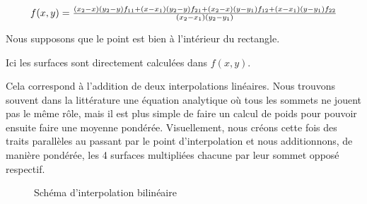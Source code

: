 \begin{equation}
    \resizebox{0.9\hsize}{!}{$
    f(x, y) = \frac{(x_2 - x)(y_2 - y)f_{11} + (x - x_1)(y_2 - y)f_{21} + (x_2 - x)(y - y_1)f_{12} + (x - x_1)(y - y_1)f_{22}}{(x_2 - x_1)(y_2 - y_1)}
    $}
\end{equation}
                
Nous supposons que le point est bien à l'intérieur du rectangle.

Ici les surfaces sont directement calculées dans \(f(x, y)\).

Cela correspond à l'addition de deux interpolations linéaires. Nous trouvons souvent dans la littérature une équation analytique où tous les sommets ne jouent pas le même rôle, mais il est plus simple de faire un calcul de poids pour pouvoir ensuite faire une moyenne pondérée. 
Visuellement, nous créons cette fois des traits parallèles au passant par le point d'interpolation et nous additionnons, de manière pondérée, les 4 surfaces multipliées chacune par leur sommet opposé respectif.

\begin{figure}[H]
    \centering
    \caption{Schéma d'interpolation bilinéaire}
\end{figure}


